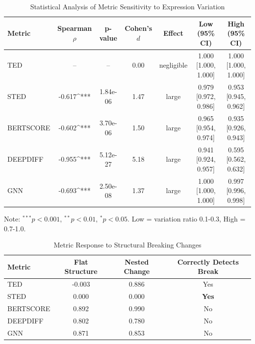 
\begin{table}[h]
\centering
\caption{Statistical Analysis of Metric Sensitivity to Expression Variation}
\label{tab:variation_stats}
\begin{tabular}{lcccccc}
\toprule
Metric & Spearman $\rho$ & p-value & Cohen's $d$ & Effect & Low (95\% CI) & High (95\% CI) \\
\midrule
TED & -- & -- & 0.00 & negligible & 1.000 [1.000, 1.000] & 1.000 [1.000, 1.000] \\
STED & -0.617^{***} & 1.84e-06 & 1.47 & large & 0.979 [0.972, 0.986] & 0.953 [0.945, 0.962] \\
BERTSCORE & -0.602^{***} & 3.70e-06 & 1.50 & large & 0.965 [0.954, 0.974] & 0.935 [0.926, 0.943] \\
DEEPDIFF & -0.955^{***} & 5.12e-27 & 5.18 & large & 0.941 [0.924, 0.957] & 0.595 [0.562, 0.632] \\
GNN & -0.693^{***} & 2.50e-08 & 1.37 & large & 1.000 [1.000, 1.000] & 0.997 [0.996, 0.998] \\
\bottomrule
\end{tabular}
\begin{tablenotes}
\small
\item Note: $^{***}p<0.001$, $^{**}p<0.01$, $^{*}p<0.05$. Low = variation ratio 0.1-0.3, High = 0.7-1.0.
\end{tablenotes}
\end{table}


\begin{table}[h]
\centering
\caption{Metric Response to Structural Breaking Changes}
\label{tab:breaking_changes}
\begin{tabular}{lccc}
\toprule
Metric & Flat Structure & Nested Change & Correctly Detects Break \\
\midrule
TED & -0.003 & 0.886 & Yes \\
STED & 0.000 & 0.000 & \textbf{Yes} \\
BERTSCORE & 0.892 & 0.990 & No \\
DEEPDIFF & 0.802 & 0.780 & No \\
GNN & 0.871 & 0.853 & No \\
\bottomrule
\end{tabular}
\end{table}
